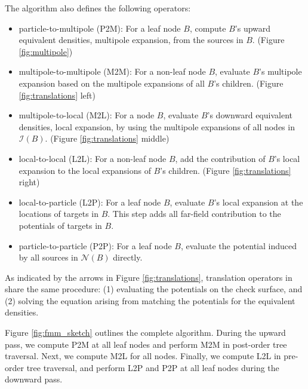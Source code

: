The algorithm also defines the following operators:
%
\begin{itemize}
    \item particle-to-multipole (P2M): For a leaf node $B$, compute $B$'s upward equivalent densities, \ie multipole expansion, from the sources in $B$. (Figure \ref{fig:multipole})
    \item multipole-to-multipole (M2M): For a non-leaf node $B$, evaluate $B$'s multipole expansion based on the multipole expansions of all $B$'s children. (Figure \ref{fig:translations} left)
    \item multipole-to-local (M2L): For a node $B$, evaluate $B$'s downward equivalent densities, \ie local expansion, by using the multipole expansions of all nodes in $\mathcal{I}(B)$. (Figure \ref{fig:translations} middle)
    \item local-to-local (L2L): For a non-leaf node $B$, add the contribution of $B$'s local expansion to the local expansions of $B$'s children. (Figure \ref{fig:translations} right)
    \item local-to-particle (L2P): For a leaf node $B$, evaluate $B$'s local expansion at the locations of targets in $B$.
    This step adds all far-field contribution to the potentials of targets in $B$. 
    \item particle-to-particle (P2P): For a leaf node $B$, evaluate the potential induced by all sources in $\mathcal{N}(B)$ directly.
\end{itemize}
%
As indicated by the arrows in Figure \ref{fig:translations}, translation operators in \kifmm share the same procedure: (1) evaluating the potentials on the check surface, and (2) solving the equation arising from matching the potentials for the equivalent densities.

Figure \ref{fig:fmm_sketch} outlines the complete \fmm algorithm.
During the upward pass, we compute P2M at all leaf nodes and perform M2M in post-order tree traversal.
Next, we compute M2L for all nodes.
Finally, we compute L2L in pre-order tree traversal, and perform L2P and P2P at all leaf nodes during the downward pass.

